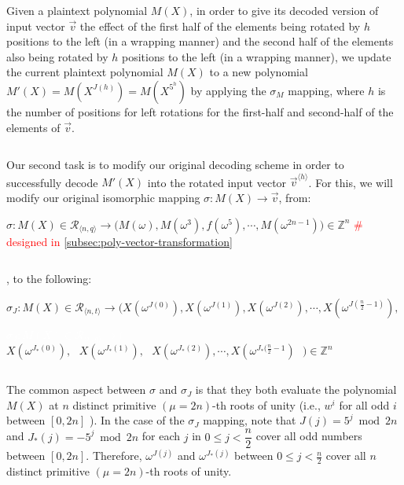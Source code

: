 Given a plaintext polynomial $M(X)$, in order to give its decoded version of input vector $\vec{v}$ the effect of the first half of the elements being rotated by $h$ positions to the left (in a wrapping manner) and the second half of the elements also being rotated by $h$ positions to the left (in a wrapping manner), we update the current plaintext polynomial $M(X)$ to a new polynomial $M'(X) = M(X^{J(h)}) = M(X^{5^h})$ by applying the $\sigma_M$ mapping, where $h$ is the number of positions for left rotations for the first-half and second-half of the elements of $\vec{v}$. 


$ $

 Our second task is to modify our original decoding scheme in order to successfully decode $M'(X)$ into the rotated input vector $\vec{v}^{\langle h \rangle}$. For this, we will modify our original isomorphic mapping $\sigma : M(X) \longrightarrow \vec{v}$, from:

$\sigma: M(X) \in \mathcal{R}_{\langle n, q \rangle} \longrightarrow  \bm{(}M(\omega), M(\omega^3),f(\omega^5), \cdots, M(\omega^{2n-1})\bm{)} \in \mathbb{Z}^n$ \textcolor{red}{ \text{ } \# designed in \autoref{subsec:poly-vector-transformation}}

$ $

, to the following: 

$\sigma_J: M(X) \in \mathcal{R}_{\langle n, t \rangle} \longrightarrow  \bm{(}X(\omega^{J(0)}),X(\omega^{J(1)}),X(\omega^{J(2)}), \cdots, X(\omega^{J(\frac{n}{2} - 1)}), $

\textcolor{white}{$\sigma_J: M(X) \in \mathcal{R}_{\langle n, q \rangle} \longrightarrow  \bm{(}$} $X(\omega^{J_*(0)}), \text{ } X(\omega^{J_*(1)}), \text{ } X(\omega^{J_*(2)}), \cdots, X(\omega^{J_*(\frac{n}{2} - 1}) \text{ } \bm{)} \in \mathbb{Z}^{n}$



$ $

The common aspect between $\sigma$ and $\sigma_J$ is that they both evaluate the polynomial $M(X)$ at $n$ distinct primitive $(\mu=2n)$-th roots of unity (i.e., $w^i$ for all odd $i$ between $[0,2n]$ ). In the case of the $\sigma_J$ mapping, note that $J(j) = 5^j \bmod 2n$ \text{ } and \text{ } $J_*(j) = -5^j \bmod 2n$ \text{ } for each $j$ in $0 \leq j < \dfrac{n}{2} $ \text{ }  cover all odd numbers between $[0, 2n]$. Therefore, $\omega^{J(j)}$ and $\omega^{J_*(j)}$ between $0 \leq j < \frac{n}{2}$ cover all $n$ distinct primitive $(\mu=2n)$-th roots of unity.

